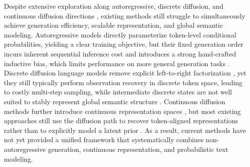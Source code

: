 Despite extensive exploration along autoregressive, discrete diffusion, and continuous diffusion directions \citep{song2020score,von2025generalized,li2025unifying,xu2024energy,goel2026skip,jarrett2025language,jeoung2025examining,lahoti2023improving}, existing methods still struggle to simultaneously achieve generation efficiency, scalable representation, and global semantic modeling. Autoregressive models directly parameterize token-level conditional probabilities, yielding a clear training objective, but their fixed generation order incurs inherent sequential inference cost and introduces a strong hand-crafted inductive bias, which limits performance on more general generation tasks \citep{lin2021limitations,berglund2023reversal,deschenaux2024promises,dalal2019autoregressive,zhu2024towards}. Discrete diffusion language models remove explicit left-to-right factorization \citep{hoogeboom2021autoregressive,gat2024discrete,hoogeboom2021argmax,zhao2025d1}, yet they still typically perform observation recovery in discrete token space, leading to costly multi-step sampling, while intermediate discrete states are not well suited to stably represent global semantic structure \citep{zheng2023reparameterized,zhou2024diffusion,venkatraman2024amortizing,srikanth2025discrete,takida2022sq,meng2022concrete,jang2016categorical}. Continuous diffusion methods further introduce continuous representation spaces \citep{sahoo2025diffusion,gong2024scaling,tae2025tess}, but most existing approaches still use the diffusion path to recover token-aligned representations rather than to explicitly model a latent prior \citep{gulrajani2023likelihood,dieleman2022continuous}. As a result, current methods have not yet provided a unified framework that systematically combines non-autoregressive generation, continuous representation, and probabilistic text modeling.

